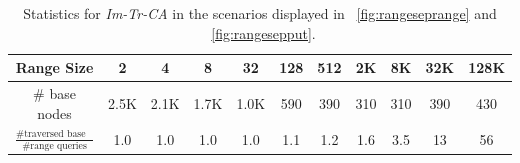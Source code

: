 \documentclass[a4paper,UKenglish]{oasics-v2016}
\begin{document}

 \begin{table}[h]%
  \caption{Statistics for \emph{Im-Tr-CA} in the scenarios displayed in \figurename~\ref{fig:rangeseprange} and \figurename~\ref{fig:rangesepput}.\label{tab:nodestats}}
      \begin{tabular}{c|cccccccccc} %
      Range Size  & 2 & 4 & 8 & 32 & 128 & 512 & 2K & 8K & 32K & 128K \\\hline
      \# base nodes & 2.5K & 2.1K & 1.7K & 1.0K & 590 & 390 & 310 & 310 & 390 & 430 \\ 
      $\frac{\text{\# traversed base nodes}}{\text{\# range queries}}$ & 1.0 & 1.0 & 1.0 & 1.0 & 1.1 & 1.2 & 1.6 & 3.5 & 13 & 56 \\ %
    \end{tabular}
\end{table} 
\end{document}
